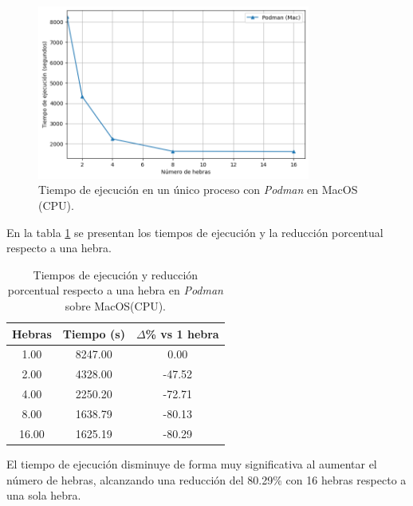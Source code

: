 \begin{figure}[ht]
    \centering
    \includegraphics[width=0.8\textwidth]{imagenes/cap5/single-node_mac_podman_time.png}
    \caption{Tiempo de ejecución en un único proceso con \textit{Podman} en MacOS (CPU).}
    \label{fig:single-node_mac_podman_time}
\end{figure}

En la tabla \ref{tab:single-node_mac_podman_time} se presentan los tiempos de ejecución y la reducción porcentual respecto a una hebra.

\begin{table}[ht]
    \centering
    \begin{tabular}{|c|c|c|}
        \hline
        \textbf{Hebras} & \textbf{Tiempo (s)} & \textbf{$\Delta$\% vs 1 hebra} \\
        \hline
        1.00            & 8247.00             & 0.00                           \\
        2.00            & 4328.00             & -47.52                         \\
        4.00            & 2250.20             & -72.71                         \\
        8.00            & 1638.79             & -80.13                         \\
        16.00           & 1625.19             & -80.29                         \\
        \hline
    \end{tabular}
    \caption{Tiempos de ejecución y reducción porcentual respecto a una hebra en \textit{Podman} sobre MacOS(CPU).}
    \label{tab:single-node_mac_podman_time}
\end{table}

El tiempo de ejecución disminuye de forma muy significativa al aumentar el número de hebras, alcanzando una reducción del 80.29\% con 16 hebras respecto a una sola hebra.

